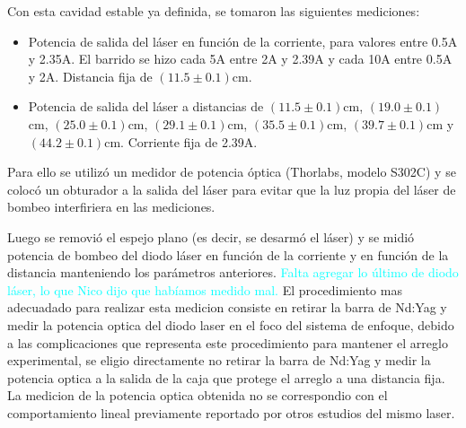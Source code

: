 \documentclass[10pt, a4paper]{article}%
\begin{document}
\begin{multicols}{2}
Con esta cavidad estable ya definida, se tomaron las siguientes mediciones:
\begin{itemize}
    \item Potencia de salida del láser en función de la corriente, para valores entre 0.5A y 2.35A. El barrido se hizo cada 5A entre 2A y 2.39A y cada 10A entre 0.5A y 2A. Distancia fija de $(11.5 \pm 0.1)$cm. 
    \item Potencia de salida del láser a distancias de $(11.5 \pm 0.1)$cm, $(19.0 \pm 0.1)$cm, $(25.0 \pm 0.1)$cm, $(29.1 \pm 0.1)$cm, $(35.5 \pm 0.1)$cm, $(39.7 \pm 0.1)$cm y $(44.2 \pm 0.1)$cm. Corriente fija de 2.39A. 
\end{itemize}
Para ello se utilizó un medidor de potencia óptica (Thorlabs, modelo S302C) y se colocó un obturador a la salida del láser para evitar que la luz propia del láser de bombeo interfiriera en las mediciones.

Luego se removió el espejo plano (es decir, se desarmó el láser) y se midió potencia de bombeo del diodo láser en función de la corriente y en función de la distancia manteniendo los parámetros anteriores. \textcolor{cyan}{Falta agregar lo último de diodo láser, lo que Nico dijo que habíamos medido mal.} El procedimiento mas adecuadado para realizar esta medicion consiste en retirar la barra de Nd:Yag y medir la potencia optica del diodo laser en el foco del sistema de enfoque, debido a las complicaciones que representa este procedimiento para mantener el arreglo experimental, se eligio directamente no retirar la barra de Nd:Yag y medir la potencia optica a la salida de la caja que protege el arreglo a una distancia fija. La medicion de la potencia optica obtenida no se correspondio con el comportamiento lineal previamente reportado por otros estudios del mismo laser. 


\end{multicols}
\end{document}
